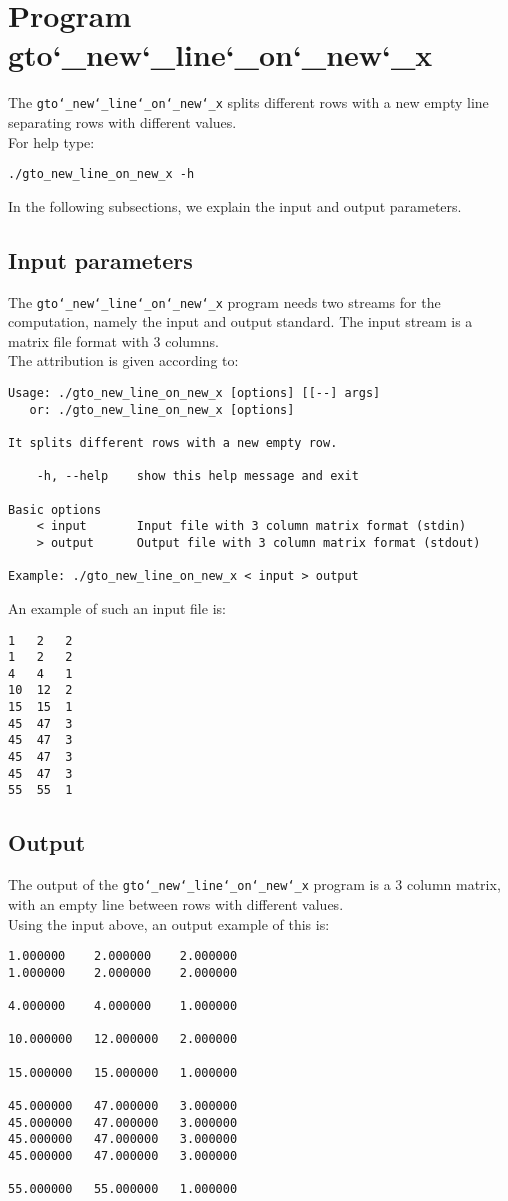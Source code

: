 \section{Program gto\char`_new\char`_line\char`_on\char`_new\char`_x}
The \texttt{gto\char`_new\char`_line\char`_on\char`_new\char`_x} splits different rows with a new empty line separating rows with different values.\\
For help type:
\begin{lstlisting}
./gto_new_line_on_new_x -h
\end{lstlisting}
In the following subsections, we explain the input and output parameters.

\subsection*{Input parameters}

The \texttt{gto\char`_new\char`_line\char`_on\char`_new\char`_x} program needs two streams for the computation, namely the input and output standard. The input stream is a matrix file format with 3 columns.\\
The attribution is given according to:
\begin{lstlisting}
Usage: ./gto_new_line_on_new_x [options] [[--] args]
   or: ./gto_new_line_on_new_x [options]

It splits different rows with a new empty row.

    -h, --help    show this help message and exit

Basic options
    < input       Input file with 3 column matrix format (stdin)
    > output      Output file with 3 column matrix format (stdout)

Example: ./gto_new_line_on_new_x < input > output
\end{lstlisting}
An example of such an input file is:
\begin{lstlisting}
1	2	2
1	2	2
4	4	1
10	12	2
15	15	1
45	47	3
45	47	3
45	47	3
45	47	3
55	55	1
\end{lstlisting}

\subsection*{Output}
The output of the \texttt{gto\char`_new\char`_line\char`_on\char`_new\char`_x} program is a 3 column matrix, with an empty line between rows with different values.\\
Using the input above, an output example of this is:
\begin{lstlisting}
1.000000	2.000000	2.000000
1.000000	2.000000	2.000000

4.000000	4.000000	1.000000

10.000000	12.000000	2.000000

15.000000	15.000000	1.000000

45.000000	47.000000	3.000000
45.000000	47.000000	3.000000
45.000000	47.000000	3.000000
45.000000	47.000000	3.000000

55.000000	55.000000	1.000000
\end{lstlisting}
